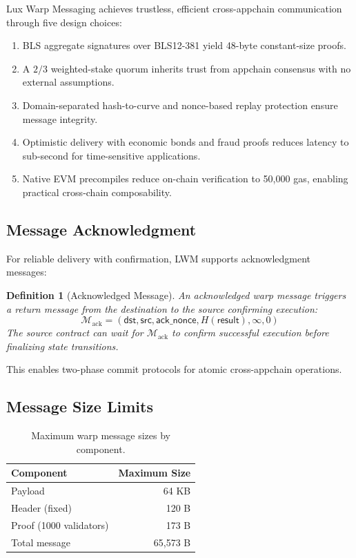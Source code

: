 \documentclass[11pt,a4paper]{article}
\newtheorem{definition}{Definition}
\begin{document}
Lux Warp Messaging achieves trustless, efficient cross-appchain communication through five design choices:

\begin{enumerate}
    \item BLS aggregate signatures over BLS12-381 yield 48-byte constant-size proofs.
    \item A $2/3$ weighted-stake quorum inherits trust from appchain consensus with no external assumptions.
    \item Domain-separated hash-to-curve and nonce-based replay protection ensure message integrity.
    \item Optimistic delivery with economic bonds and fraud proofs reduces latency to sub-second for time-sensitive applications.
    \item Native EVM precompiles reduce on-chain verification to 50,000 gas, enabling practical cross-chain composability.
\end{enumerate}

\subsection{Message Acknowledgment}

For reliable delivery with confirmation, LWM supports acknowledgment messages:

\begin{definition}[Acknowledged Message]
An acknowledged warp message triggers a return message from the destination to the source confirming execution:
\begin{equation}
    \mathcal{M}_{\text{ack}} = (\mathsf{dst}, \mathsf{src}, \mathsf{ack\_nonce}, H(\mathsf{result}), \infty, 0)
\end{equation}
The source contract can wait for $\mathcal{M}_{\text{ack}}$ to confirm successful execution before finalizing state transitions.
\end{definition}

This enables two-phase commit protocols for atomic cross-appchain operations.

\subsection{Message Size Limits}

\begin{table}[H]
\centering
\caption{Maximum warp message sizes by component.}
\label{tab:sizelimits}
\begin{tabular}{lr}
\toprule
\textbf{Component} & \textbf{Maximum Size} \\
\midrule
Payload & 64 KB \\
Header (fixed) & 120 B \\
Proof (1000 validators) & 173 B \\
Total message & 65,573 B \\
\bottomrule
\end{tabular}
\end{table}
\end{document}
